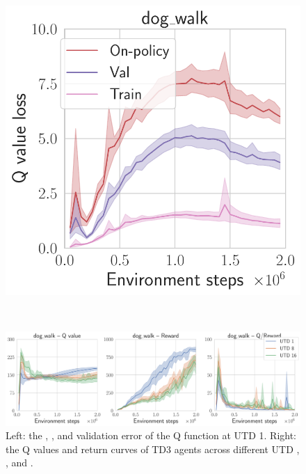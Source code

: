 % 
% 
\begin{figure}[t]
\begin{minipage}{0.25\textwidth}
    \includegraphics[width=\textwidth]{figures/mad-td/critic_loss_dog_walk.pdf}
\end{minipage}
~
\begin{minipage}{0.745\textwidth}
    \includegraphics[width=\textwidth]{figures/mad-td/q_overestimation.pdf}
\end{minipage}
\caption{Left: the , , and  validation error of the Q function at UTD 1. Right: the Q values and return curves of TD3 agents across different UTD , , and .}
\label{fig:q_eval}
\end{figure}

